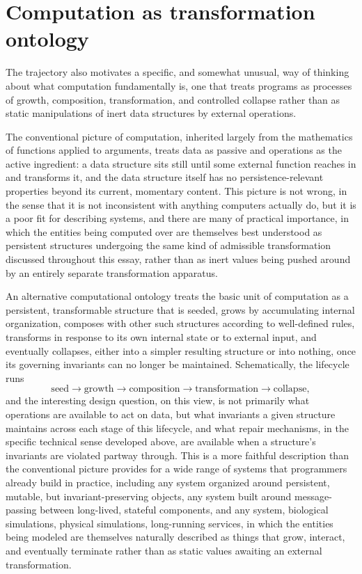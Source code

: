 \documentclass[11pt]{article}
\begin{document}
\section{Computation as transformation ontology}

The trajectory also motivates a specific, and somewhat unusual, way of thinking about what computation fundamentally is, one that treats programs as processes of growth, composition, transformation, and controlled collapse rather than as static manipulations of inert data structures by external operations.

The conventional picture of computation, inherited largely from the mathematics of functions applied to arguments, treats data as passive and operations as the active ingredient: a data structure sits still until some external function reaches in and transforms it, and the data structure itself has no persistence-relevant properties beyond its current, momentary content. This picture is not wrong, in the sense that it is not inconsistent with anything computers actually do, but it is a poor fit for describing systems, and there are many of practical importance, in which the entities being computed over are themselves best understood as persistent structures undergoing the same kind of admissible transformation discussed throughout this essay, rather than as inert values being pushed around by an entirely separate transformation apparatus.

An alternative computational ontology treats the basic unit of computation as a persistent, transformable structure that is seeded, grows by accumulating internal organization, composes with other such structures according to well-defined rules, transforms in response to its own internal state or to external input, and eventually collapses, either into a simpler resulting structure or into nothing, once its governing invariants can no longer be maintained. Schematically, the lifecycle runs
$$\text{seed} \rightarrow \text{growth} \rightarrow \text{composition} \rightarrow \text{transformation} \rightarrow \text{collapse},$$
and the interesting design question, on this view, is not primarily what operations are available to act on data, but what invariants a given structure maintains across each stage of this lifecycle, and what repair mechanisms, in the specific technical sense developed above, are available when a structure's invariants are violated partway through. This is a more faithful description than the conventional picture provides for a wide range of systems that programmers already build in practice, including any system organized around persistent, mutable, but invariant-preserving objects, any system built around message-passing between long-lived, stateful components, and any system, biological simulations, physical simulations, long-running services, in which the entities being modeled are themselves naturally described as things that grow, interact, and eventually terminate rather than as static values awaiting an external transformation.
\end{document}

